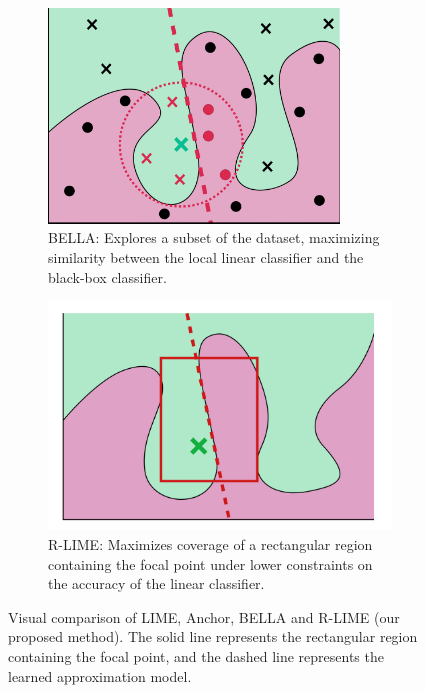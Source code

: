 \documentclass[runningheads]{llncs}
\begin{document}
\begin{figure}[tb]
\begin{subfigure}[t]{0.45\textwidth}
    \centering
    \includegraphics[width=0.85\textwidth]{bella}
    \caption{%
      BELLA: Explores a subset of the dataset,
      maximizing similarity between the local linear classifier
      and the black-box classifier.
    }\label{fig:bella}
  \end{subfigure}
  \hfill
  \begin{subfigure}[t]{0.45\textwidth}
    \centering
    \includegraphics[width=\textwidth]{rlime3}
    \caption{%
      R-LIME:
      Maximizes coverage of a rectangular region containing the focal point
      under lower constraints on the accuracy of the linear classifier.
    }\label{fig:rlime}
  \end{subfigure}
  \caption{%
    Visual comparison of LIME, Anchor, BELLA and R-LIME (our proposed method).
    The solid line represents the rectangular region containing the focal
    point, and the dashed line represents the learned approximation model.
  }
\end{figure}
\end{document}
